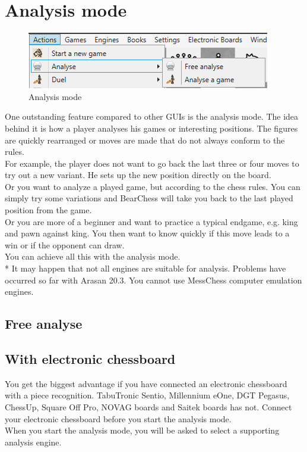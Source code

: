 \documentclass[11pt,a4paper]{article}
\begin{document}
\section{Analysis mode} \label{AnalyzeMode}


\begin{figure}[H]
	\centering
	\includegraphics[scale=1.0]{AnalyzeMode.png}
	\caption{Analysis mode}
	\label{fig:AnalyzeMode}
\end{figure}


One outstanding feature compared to other GUIs is the analysis mode. The idea behind it is how a player analyses his games or interesting positions. The figures are quickly rearranged or moves are made that do not always conform to the rules.\\
For example, the player does not want to go back the last three or four moves to try out a new variant. He sets up the new position directly on the board.\\
Or you want to analyze a played game, but according to the chess rules. You can simply try some variations and BearChess will take you back to the last played position from the game.\\
Or you are more of a beginner and want to practice a typical endgame, e.g. king and pawn against king. You then want to know quickly if this move leads to a win or if the opponent can draw.\\
You can achieve all this with the analysis mode.\\


{\color{red}*} It may happen that not all engines are suitable for analysis. Problems have occurred so far with Arasan 20.3. You cannot use MessChess computer emulation engines.

\subsection{Free analyse} \label{AnalyzeMode1}

\subsection{With electronic chessboard}

You get the biggest advantage if you have connected an electronic chessboard with a piece recognition. TabuTronic Sentio, Millennium eOne, DGT Pegasus, ChessUp, Square Off Pro, NOVAG boards and Saitek boards has not. Connect your electronic chessboard before you start the analysis mode.\\ 
When you start the analysis mode, you will be asked to select a supporting analysis engine.
\end{document}
